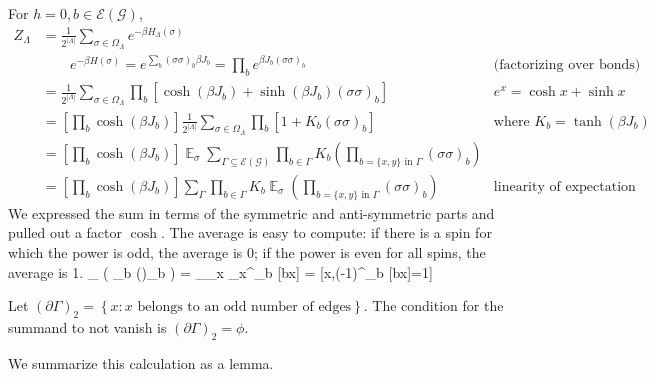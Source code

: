 For $h=0, b\in \mathcal{E}(\mathcal{G})$,
\begin{align*}
Z_{\Lambda} &= \frac{1}{2^{|\Lambda|}} \sum_{\sigma \in \Omega_{\Lambda}} e^{-\beta H_{\Lambda}(\sigma)}\\
&\qquad e^{-\beta H(\sigma)} = e^{\sum_b (\sigma\sigma)_b \beta J_b} = \prod_b e^{\beta J_b (\sigma\sigma)_b}& \text{(factorizing over bonds)}\\
&=\frac{1}{2^{|\Lambda|}} \sum_{\sigma\in \Omega_{\Lambda}} \prod_b [\cosh(\beta J_b) + \sinh(\beta J_b)(\sigma\sigma)_b]&e^x = \cosh x + \sinh x\\
&=\left[ {\prod_b \cosh(\beta J_b)} \right] \frac{1}{2^{|\Lambda|}}\sum_{\sigma\in \Omega_{\Lambda}} \prod_b[1+K_b(\sigma\sigma)_b]&\text{where }K_b=\tanh(\beta J_b)\\
&=\left[ {\prod_b \cosh(\beta J_b)} \right] \mathop{\mathbb E}_{\sigma} \sum_{\Gamma\subseteq \mathcal{E}(\mathcal{G})}\prod_{b\in \Gamma}K_b \left( {\prod_{b=\{x,y\}\text{ in }\Gamma} (\sigma\sigma)_b} \right)\\ 
&=\left[ {\prod_b \cosh(\beta J_b)} \right] \sum_{\Gamma}\prod_{b\in \Gamma}K_b
\mathop{\mathbb E}_{\sigma} \left( {\prod_{b=\{x,y\}\text{ in }\Gamma} (\sigma\sigma)_b} \right)&\text{linearity of expectation}
\end{align*}
We expressed the sum in terms of the symmetric and anti-symmetric parts and pulled out a factor $\cosh$. 
The average is easy to compute: if there is a spin for which the power is odd, the average is 0; if the power is even for all spins, the average is 1.
\be
{}_{\sigma} \left( {\prod_{b\in \Gamma} (\sigma\sigma)_b} \right) = _{\sigma}\prod_x \sigma_x^{\sum_{b\in \Gamma}  [b\ni x]}
= [\forall x,(-1)^{\sum_{b\in \Gamma} [b\ni x]}=1]
\ee

Let $(\partial \Gamma)_2=\left\{{x}:{x\text{ belongs to an odd number of edges}}\right\}$. The condition for the summand to not vanish is $(\partial \Gamma)_2=\phi$.

We summarize this calculation as a lemma.

